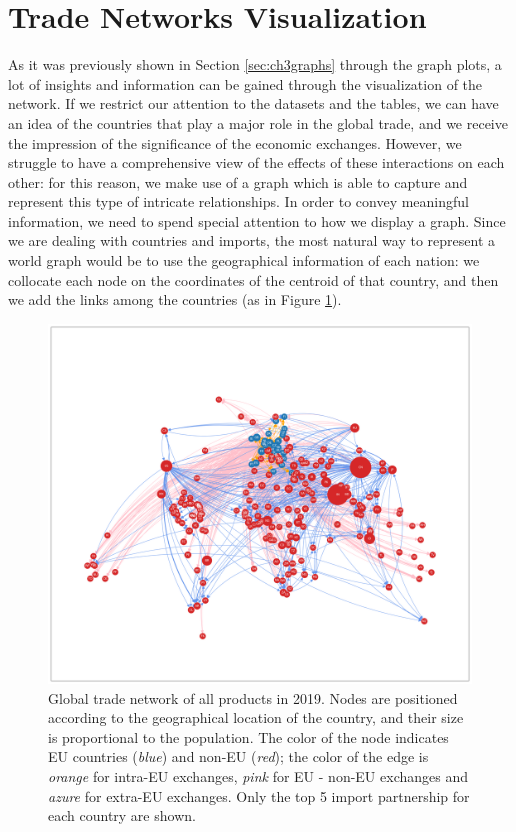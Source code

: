 \pagebreak
\section{Trade Networks Visualization}\label{sec:4visualization}

As it was previously shown in Section \ref{sec:ch3graphs} through the graph plots, a lot of insights and information can be gained through the visualization of the network. If we restrict our attention to the datasets and the tables, we can have an idea of the countries that play a major role in the global trade, and we receive the impression of the significance of the economic exchanges. However, we struggle to have a comprehensive view of the effects of these interactions on each other: for this reason, we make use of a graph which is able to capture and represent this type of intricate relationships. In order to convey meaningful information, we need to spend special attention to how we display a graph. Since we are dealing with countries and imports, the most natural way to represent a world graph would be to use the geographical information of each nation: we collocate each node on the coordinates of the centroid of that country, and then we add the links among the countries (as in Figure \ref{fig:geograph}).
\begin{figure}
    \centering
    \includegraphics[width=\textwidth]{pics/full_y19_pTO_geo.png}
    \caption[Global trade network of all products in 2019.]{Global trade network of all products in 2019. Nodes are positioned according to the geographical location of the country, and their size is proportional to the population. The color of the node indicates EU countries (\textit{blue}) and non-EU (\textit{red}); the color of the edge is \textit{orange} for intra-EU exchanges, \textit{pink} for EU - non-EU exchanges and \textit{azure} for extra-EU exchanges. Only the top 5 import partnership for each country are shown.}
    \label{fig:geograph}
\end{figure}
